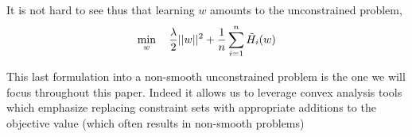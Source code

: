 It is not hard to see thus that learning $w$ amounts to the unconstrained problem,
\begin{equation}
  \min_{w} \quad\frac{\lambda}{2}||w||^{2}+ \frac{1}{n}\sum_{i=1}^{n}\Tilde{H}_{i}(w)
  \label{eq:svm-non-smooth}
\end{equation}

This last formulation into a non-smooth unconstrained problem is the one we will
focus throughout this paper. Indeed it allows us to leverage convex analysis
tools which emphasize replacing constraint sets with appropriate additions to
the objective value (which often results in non-smooth problems)
